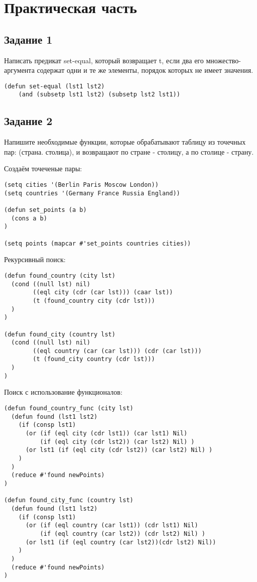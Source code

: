 \chapter{Практическая часть}

\section{Задание \No{}1}

Написать предикат set-equal, который возвращает t, если два его множество-
аргумента содержат одни и те же элементы, порядок которых не имеет значения.

\begin{lstlisting}
(defun set-equal (lst1 lst2)
    (and (subsetp lst1 lst2) (subsetp lst2 lst1))
\end{lstlisting}

\section{Задание \No{}2}
Напишите необходимые функции, которые обрабатывают таблицу из точечных пар:
(страна. столица), и возвращают по стране - столицу, а по столице - страну.

Создаём точеченые пары:

\begin{lstlisting}
(setq cities '(Berlin Paris Moscow London))
(setq countries '(Germany France Russia England))

(defun set_points (a b)
  (cons a b)
)

(setq points (mapcar #'set_points countries cities))
\end{lstlisting}

Рекурсивный поиск:

\begin{lstlisting}
(defun found_country (city lst)
  (cond ((null lst) nil)
        ((eql city (cdr (car lst))) (caar lst))
        (t (found_country city (cdr lst)))
  )
)

(defun found_city (country lst)
  (cond ((null lst) nil)
        ((eql country (car (car lst))) (cdr (car lst)))
        (t (found_city country (cdr lst)))
  )
)
\end{lstlisting}

Поиск с использование функционалов:

\begin{lstlisting}
(defun found_country_func (city lst)
  (defun found (lst1 lst2)
    (if (consp lst1)
      (or (if (eql city (cdr lst1)) (car lst1) Nil)
          (if (eql city (cdr lst2)) (car lst2) Nil) )
      (or lst1 (if (eql city (cdr lst2)) (car lst2) Nil) )
    )
  )
  (reduce #'found newPoints)
)

(defun found_city_func (country lst)
  (defun found (lst1 lst2)
    (if (consp lst1)
      (or (if (eql country (car lst1)) (cdr lst1) Nil)
          (if (eql country (car lst2)) (cdr lst2) Nil) )
      (or lst1 (if (eql country (car lst2))(cdr lst2) Nil))
    )
  )
  (reduce #'found newPoints)
)
\end{lstlisting}


